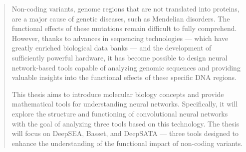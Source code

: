 \begin{abstract}
    Non-coding variants, genome regions that are not translated into proteins, are a major cause of genetic diseases, such as Mendelian disorders. The functional effects of these mutations remain difficult to fully comprehend. However, thanks to advances in sequencing technologies — which have greatly enriched biological data banks — and the development of sufficiently powerful hardware, it has become possible to design neural network-based tools capable of analyzing genomic sequences and providing valuable insights into the functional effects of these specific DNA regions.

    This thesis aims to introduce molecular biology concepts and provide mathematical tools for understanding neural networks. Specifically, it will explore the structure and functioning of convolutional neural networks with the goal of analyzing three tools based on this technology. The thesis will focus on DeepSEA, Basset, and DeepSATA — three tools designed to enhance the understanding of the functional impact of non-coding variants.
\end{abstract}
